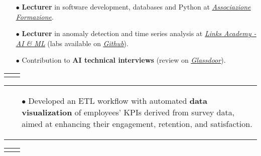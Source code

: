 \documentclass[11pt,a4paper,sans,english]{moderncv}
\makeatletter
\renewcommand*{\cventry}[6][.25em]{%
	\vspace{1.5mm}%
	\begin{tabular*}{\textwidth}{@{\extracolsep{\fill}}ll}%
		\ifthenelse{\equal{#3}{}}{}{\textbf{#3}} &
		\ifthenelse{\equal{#2}{}}{}{#4 #6 #2}\\%
	\end{tabular*}%
	\par\addvspace{#1}}
\newcommand*{\mycvitem}[2][.25em]{%
	\vspace{-.25em}
	\begin{tabular}{@{}p{\textwidth}@{}}%
		\small#2%
	\end{tabular}%
	\par\addvspace{-0.7em}  %
}
\newcommand*{\cvtag}[1]{%
	\textcolor{lightgray!50!black}{\fbox{\mathstrut\scriptsize\textsf{\textbf{#1}}}}%
}
\makeatother
\begin{document}
{\begin{itemize}
			\item[$\bullet$] \textbf{Lecturer} in software development, databases and Python at \href{https://www.associazioneformazione.it/formazione-professionale/ifts-tecnico-per-la-progettazione-e-lo-sviluppo-di-applicazioni-informatiche}{\textit{\underline{Associazione Formazione}}}.
			\item[$\bullet$] \textbf{Lecturer} in anomaly detection  and time series analysis at \href{https://academy.linksmt.it/corso-di-formazione-post-laurea-artificial-intelligence-machine-learning/}{\textit{\underline{Links Academy - AI \& ML}}} (labs available on	 \href{https://github.com/francesco-s/Links-Academy---Anomaly-Detection-Time-series-analysis}{\textit{\underline{Github}}}).
			\item[$\bullet$] Contribution to \textbf{AI technical interviews} (review on \href{https://www.glassdoor.it/Colloquio/Links-Management-and-Technology-Colloquio-RVW82686296.htm}{\textit{\underline{Glassdoor}}}).
	\end{itemize}}
 \vspace*{.25cm}
\cventry{\textcolor{gray}{\scalebox{0.8}\faCalendar} 10/2022--02/2023}{Artificial Intelligence and Data - Analyst}{\textcolor{gray}{\scalebox{0.8}\faBuilding} \href{https://www2.deloitte.com}{\textit{Deloitte}} }{}{\textcolor{gray}{\scalebox{0.8}\faMapMarker} Bari }{}
\mycvitem{
\vspace*{-.6cm}
\begin{flushleft}
	\noindent
	\cvtag{Qlik Sense} \cvtag{SQL} \cvtag{MS Excel} \cvtag{Qlik NPrinting}
\end{flushleft}
\vspace*{-.2cm}
\begin{itemize}
	\item[$\bullet$] Developed an ETL workflow with automated \textbf{data visualization} of employees' KPIs derived from survey data, aimed at enhancing their engagement, retention, and satisfaction.
\end{itemize}}
\vspace*{.25cm}
\cventry{\textcolor{gray}{\scalebox{0.8}\faCalendar} 12/2021--05/2022}{AI engineer and System Administrator - Intern}{\textcolor{gray}{\scalebox{0.8}\faBuilding} \href{https://www.intesasanpaolo.com/}{\textit{Intesa Sanpaolo}} }{}{\textcolor{gray}{\scalebox{0.8}\faMapMarker} Torino }{}
\end{document}
